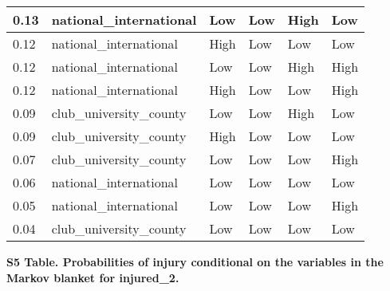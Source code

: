 \documentclass[
]{article}
\begin{document}
\begin{table}[H]
\begin{tabular}[t]{l|l|l|l|l|l}
\hline
0.13 & national\_international & Low & Low & High & Low\\
\hline
0.12 & national\_international & High & Low & Low & Low\\
\hline
0.12 & national\_international & Low & Low & High & High\\
\hline
0.12 & national\_international & High & Low & Low & High\\
\hline
0.09 & club\_university\_county & Low & Low & High & Low\\
\hline
0.09 & club\_university\_county & High & Low & Low & Low\\
\hline
0.07 & club\_university\_county & Low & Low & Low & High\\
\hline
0.06 & national\_international & Low & Low & Low & Low\\
\hline
0.05 & national\_international & Low & Low & Low & High\\
\hline
0.04 & club\_university\_county & Low & Low & Low & Low\\
\hline
\end{tabular}
\end{table}

\newpage

\textbf{S5 Table. Probabilities of injury conditional on the variables in the Markov blanket for injured\_2.}
\end{document}
